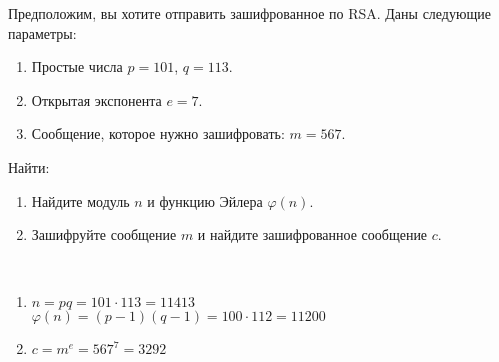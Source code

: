 \begin{problem}
    Предположим, вы хотите отправить зашифрованное по RSA. Даны следующие параметры:
    \begin{enumerate}
        \item Простые числа $p = 101$, $q = 113$.
        \item Открытая экспонента $e = 7$.
        \item Сообщение, которое нужно зашифровать: $m = 567$.
    \end{enumerate}
    Найти:
    \begin{enumerate}
        \item Найдите модуль $n$ и функцию Эйлера $\varphi(n)$.
        \item Зашифруйте сообщение $m$ и найдите зашифрованное
        сообщение $c$. 
    \end{enumerate}
\end{problem}
\begin{solution} \
    \begin{enumerate}
        \item \(n = pq = 101 \cdot 113 = 11413\) \\
        \( \varphi(n) = (p - 1)(q - 1) = 100 \cdot 112 = 11200 \)
        \item \(c = m^e = 567^7 = 3292 \)
    \end{enumerate}
\end{solution}
